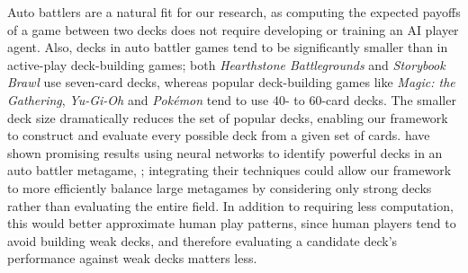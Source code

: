 Auto battlers are a natural fit for our research, as computing the
expected payoffs of a game between two decks does not require
developing or training an AI player agent. Also, decks in auto battler
games tend to be significantly smaller than in active-play
deck-building games; both \textit{Hearthstone Battlegrounds} and
\textit{Storybook Brawl} use seven-card decks, whereas popular
deck-building games like \textit{Magic: the Gathering},
\textit{Yu-Gi-Oh} and \textit{Pokémon} tend to use 40- to 60-card
decks.
The smaller deck size dramatically reduces the set of popular decks,
enabling our framework to construct and evaluate every possible deck
from a given set of cards. \citeauthor{xumining} have shown promising
results using neural networks to identify powerful decks in an auto
battler metagame, \cite{xumining}; integrating their techniques could
allow our framework to more efficiently balance large metagames by
considering only strong decks rather than evaluating the entire
field. In addition to requiring less computation, this would better
approximate human play patterns, since human players tend to avoid
building weak decks, and therefore evaluating a candidate deck's
performance against weak decks matters less.

